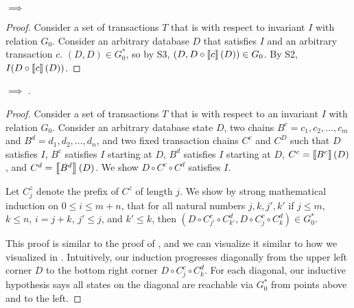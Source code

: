 \begin{claim}\label{clm:istrengthstar-implies-ipreservation}
  \istrengthstar $\implies$ \ipreservation
\end{claim}
\begin{proof}
  Consider a set of transactions $T$ that is \istrongstar{} with respect to
  invariant $I$ with relation $G_0$. Consider an arbitrary database $D$ that
  satisfies $I$ and an arbitrary \imp{} transaction $c$. $(D, D) \in G_0^*$,
  so by S3, $(D, D \circ \left\llbracket c\right\rrbracket(D)) \in G_0$. By S2, $I(D \circ \left\llbracket c\right\rrbracket(D))$.
\end{proof}

\begin{claim}\label{clm:istrengthstar-implies-iconfluence}
  \istrengthstar{} $\implies$ \iconfluence{}.
\end{claim}
\begin{proof}
  Consider a set of transactions $T$ that is \istrongstar{} with respect to an
  invariant $I$ with relation $G_0$. Consider an arbitrary database state $D$,
  two \imp{} chains $B^c = c_1, c_2, \ldots, c_m$ and $B^d = d_1, d_2, \ldots,
  d_n$, and two fixed transaction chains $C^c$ and $C^D$ such that $D$
  satisfies $I$, $B^c$ satisfies $I$ starting at $D$, $B^d$ satisfies $I$
  starting at $D$, $C^c = \left\llbracket B^c\right\rrbracket(D)$, and $C^d = \left\llbracket B^d\right\rrbracket(D)$. We
  show $D \circ C^c \circ C^d$ satisfies $I$.

  Let $C^z_j$ denote the prefix of $C^z$ of length $j$. We show by strong
  mathematical induction on $0 \leq i \leq m + n$, that for all natural numbers
  $j, k, j', k'$ if
    $j \leq m$,
    $k \leq n$,
    $i = j + k$,
    $j' \leq j$, and
    $k' \leq k$, then
  $(D \circ C^c_{j'} \circ C^d_{k'}, D \circ C^c_j \circ C^d_k) \in G_0^*$.

  This proof is similar to the proof of , and we can
  visualize it similar to how we visualized  in
  . Intuitively, our induction progresses diagonally from
  the upper left corner $D$ to the bottom right corner $D \circ C^c_j \circ
  C^d_k$. For each diagonal, our inductive hypothesis says all states on the
  diagonal are reachable via $G_0^*$ from points above and to the left.


\end{proof}

